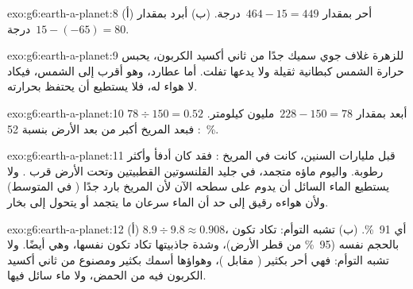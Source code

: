 \begin{solution}{exo:g6:earth-a-planet:8}
(أ) أحر بمقدار $464 - 15 = 449$~درجة. (ب) أبرد بمقدار $15 - (-65) = 80$~درجة.
\end{solution}

\begin{solution}{exo:g6:earth-a-planet:9}
للزهرة غلاف جوي سميك جدًا من ثاني أكسيد الكربون، يحبس حرارة
الشمس كبطانية ثقيلة ولا يدعها تفلت. أما عطارد، وهو أقرب إلى
الشمس، فيكاد لا هواء له، فلا يستطيع أن يحتفظ بحرارته.
\end{solution}

\begin{solution}{exo:g6:earth-a-planet:10}
أبعد بمقدار $228 - 150 = 78$~مليون كيلومتر. $78 \div 150 = 0.52$: فبعد المريخ
أكبر من بعد الأرض بنسبة 52~\%.
\end{solution}

\begin{solution}{exo:g6:earth-a-planet:11}
قبل مليارات السنين، كانت في المريخ   : فقد كان أدفأ
وأكثر رطوبة. واليوم ماؤه متجمد، في جليد القلنسوتين القطبيتين وتحت
الأرض قرب . ولا يستطيع الماء السائل أن يدوم على سطحه الآن
لأن المريخ بارد جدًا ( في المتوسط) ولأن هواءه
رقيق إلى حد أن الماء سرعان ما يتجمد أو يتحول إلى بخار.
\end{solution}

\begin{solution}{exo:g6:earth-a-planet:12}
(أ) $8.9 \div 9.8 \approx 0.908$، أي 91~\%. (ب) تشبه التوأم: تكاد تكون
بالحجم نفسه (95~\% من قطر الأرض)، وشدة جاذبيتها تكاد تكون نفسها،
وهي  أيضًا. ولا تشبه التوأم: فهي أحر بكثير
( مقابل )، وهواؤها أسمك بكثير ومصنوع من
ثاني أكسيد الكربون فيه  من الحمض، ولا ماء سائل فيها.
\end{solution}

